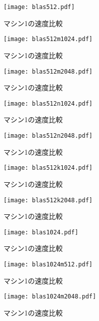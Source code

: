 \documentclass[11pt,a4paper]{jsreport}
\theoremstyle{definition}
\begin{document}
\begin{figure}[htbp]
\centering
\texttt{[image: blas512.pdf]}
\caption{マシン1の速度比較}
\end{figure}


\begin{figure}[H]
\centering
\texttt{[image: blas512m1024.pdf]}
\caption{マシン1の速度比較}
\end{figure}

\begin{figure}[H]
\centering
\texttt{[image: blas512m2048.pdf]}
\caption{マシン1の速度比較}
\end{figure}

\begin{figure}[H]
\centering
\texttt{[image: blas512n1024.pdf]}
\caption{マシン1の速度比較}
\end{figure}

\begin{figure}[H]
\centering
\texttt{[image: blas512n2048.pdf]}
\caption{マシン1の速度比較}
\end{figure}

\begin{figure}[H]
\centering
\texttt{[image: blas512k1024.pdf]}
\caption{マシン1の速度比較}
\end{figure}

\begin{figure}[H]
\centering
\texttt{[image: blas512k2048.pdf]}
\caption{マシン1の速度比較}
\end{figure}

\begin{figure}[H]
\centering
\texttt{[image: blas1024.pdf]}
\caption{マシン1の速度比較}
\end{figure}

\begin{figure}[H]
\centering
\texttt{[image: blas1024m512.pdf]}
\caption{マシン1の速度比較}
\end{figure}

\begin{figure}[H]
\centering
\texttt{[image: blas1024m2048.pdf]}
\caption{マシン1の速度比較}
\end{figure}
\end{document}
